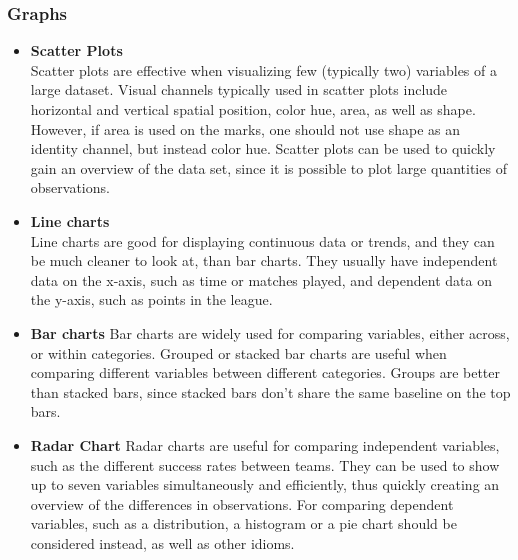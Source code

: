 \documentclass[Report.tex]{subfiles}
\begin{document}
\subsubsection{Graphs}
\begin{itemize}
  \item \textbf{Scatter Plots}
  \\Scatter plots are effective when visualizing few (typically two) variables
  of a large dataset\cite[Chapter 5, p. 54]{Iliinsky}. Visual channels typically used in
  scatter plots include horizontal and vertical spatial position, color hue, area, as well as shape. However,
  if area is used on the marks, one should not use shape as an identity channel,
  but instead color hue. 
  Scatter plots can be used to quickly gain an overview of the data set, since
  it is possible to plot large quantities of observations.
  
  \item \textbf{Line charts}
  \\Line charts are good for displaying continuous data or trends, and they can
  be much cleaner to look at, than bar charts. They usually have independent
  data on the x-axis, such as time or matches played, and dependent data on the
  y-axis, such as points in the league.
  
  \item \textbf{Bar charts}
  Bar charts are widely used for comparing variables, either across, or within
  categories. Grouped or stacked bar charts are useful when comparing different variables between different categories.
 Groups are better than stacked bars, since stacked
  bars don't share the same baseline on the top bars.
  
  \item \textbf{Radar Chart}
  Radar charts are useful for comparing independent variables, such as the
  different success rates between teams. They can be used to show up to seven
  variables simultaneously and efficiently, thus quickly creating an overview of the
  differences in observations. For comparing dependent variables, such as a
  distribution, a histogram or a pie chart should be considered instead, as well
  as other idioms.

\end{itemize}
\end{document}
